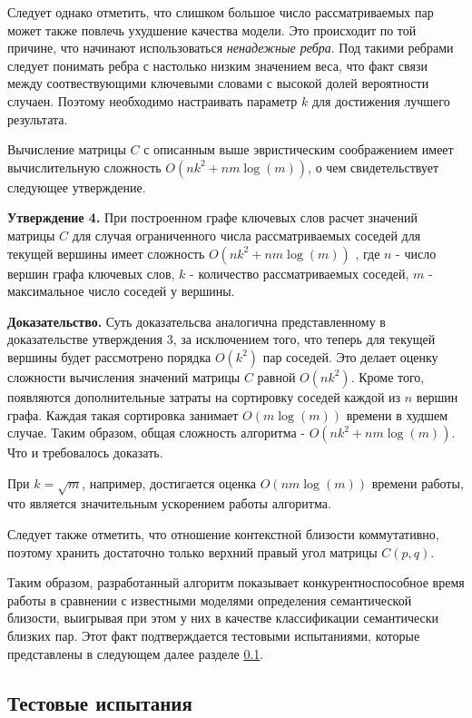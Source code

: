 Следует однако отметить, что слишком большое число рассматриваемых пар может также повлечь ухудшение качества модели. Это происходит по той причине, что начинают использоваться \emph{ненадежные ребра}. Под такими ребрами следует понимать ребра с настолько низким значением веса, что факт связи между соотвествующими ключевыми словами с высокой долей вероятности случаен. Поэтому необходимо настраивать параметр $k$ для достижения лучшего результата.

Вычисление матрицы $C$ с описанным выше эвристическим соображением имеет вычислительную сложность $O(nk^2+nm\log(m))$, о чем свидетельствует следующее утверждение.

\textbf{Утверждение 4.} При построенном графе ключевых слов расчет значений матрицы $C$ для случая ограниченного числа рассматриваемых соседей для текущей вершины имеет сложность $O(nk^2+nm\log(m))$ , где $n$ - число вершин графа ключевых слов, $k$ - количество рассматриваемых соседей, $m$ - максимальное число соседей у вершины.

\textbf{Доказательство.} Суть доказательсва аналогична представленному в доказательстве утверждения 3, за исключением того, что теперь для текущей вершины будет рассмотрено порядка $O(k^2)$ пар соседей. Это делает оценку сложности вычисления значений матрицы $C$ равной $O(nk^2)$. Кроме того, появляются дополнительные затраты на сортировку соседей каждой из $n$ вершин графа. Каждая такая сортировка занимает $O(m\log(m))$ времени в худшем случае. Таким образом, общая сложность алгоритма - $O(nk^2 + nm\log(m))$. Что и требовалось доказать.

При $k=\sqrt{m}$, например, достигается оценка $O(nm\log(m))$ времени работы, что является значительным ускорением работы алгоритма.

Следует также отметить, что отношение контекстной близости коммутативно, поэтому хранить достаточно только верхний правый угол матрицы $C(p,q)$.

Таким образом, разработанный алгоритм показывает конкурентноспособное время работы в сравнении с известными моделями определения семантической близости, выигрывая при этом у них в качестве классификации семантически близких пар. Этот факт подтверждается тестовыми испытаниями, которые представлены в следующем далее разделе \ref{cont_sim_experiment}.


\subsection{Тестовые испытания} \label{cont_sim_experiment}

